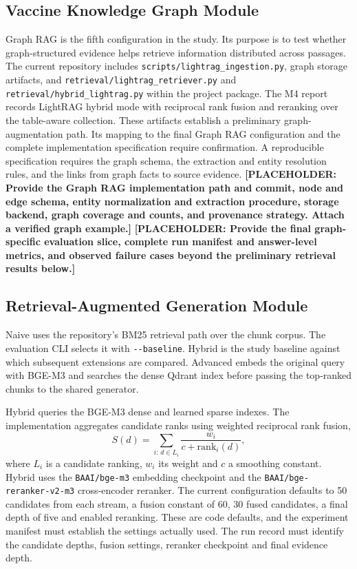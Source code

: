 \documentclass[oneside]{sn-jnl}
\newcommand{\pending}[1]{\textbf{\textcolor{red!65!black}{[PLACEHOLDER: #1]}}}
\newcommand{\artifact}[1]{\nolinkurl{#1}}
\begin{document}
\subsection{Vaccine Knowledge Graph Module}
Graph RAG is the fifth configuration in the study. Its purpose is to test whether graph-structured evidence helps retrieve information distributed across passages. The current repository includes \artifact{scripts/lightrag_ingestion.py}, graph storage artifacts, and \artifact{retrieval/lightrag_retriever.py} and \artifact{retrieval/hybrid_lightrag.py} within the project package. The M4 report records LightRAG hybrid mode with reciprocal rank fusion and reranking over the table-aware collection. These artifacts establish a preliminary graph-augmentation path. Its mapping to the final Graph RAG configuration and the complete implementation specification require confirmation. A reproducible specification requires the graph schema, the extraction and entity resolution rules, and the links from graph facts to source evidence.
\pending{Provide the Graph RAG implementation path and commit, node and edge schema, entity normalization and extraction procedure, storage backend, graph coverage and counts, and provenance strategy. Attach a verified graph example.}
\pending{Provide the final graph-specific evaluation slice, complete run manifest and answer-level metrics, and observed failure cases beyond the preliminary retrieval results below.}

\subsection{Retrieval-Augmented Generation Module}
Naive uses the repository's BM25 retrieval path over the chunk corpus. The evaluation CLI selects it with \artifact{--baseline}. Hybrid is the study baseline against which subsequent extensions are compared. Advanced embeds the original query with BGE-M3 and searches the dense Qdrant index before passing the top-ranked chunks to the shared generator.

Hybrid queries the BGE-M3 dense and learned sparse indexes. The implementation aggregates candidate ranks using weighted reciprocal rank fusion,
\[
 S(d)=\sum_{i:\,d\in L_i}\frac{w_i}{c+\mathrm{rank}_i(d)},
\]
where \(L_i\) is a candidate ranking, \(w_i\) its weight and \(c\) a smoothing constant. Hybrid uses the \artifact{BAAI/bge-m3} embedding checkpoint and the \artifact{BAAI/bge-reranker-v2-m3} cross-encoder reranker. The current configuration defaults to 50 candidates from each stream, a fusion constant of 60, 30 fused candidates, a final depth of five and enabled reranking. These are code defaults, and the experiment manifest must establish the settings actually used. The run record must identify the candidate depths, fusion settings, reranker checkpoint and final evidence depth.
\end{document}
